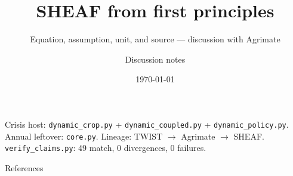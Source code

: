 \documentclass[11pt,aspectratio=169]{beamer}
\title{SHEAF from first principles}
\subtitle{Equation, assumption, unit, and source --- discussion with Agrimate}
\author{Discussion notes}
\date{\today}
\begin{document}
\begin{frame}
\titlepage
\vspace{-1.2em}
\begin{center}
{\scriptsize Crisis host: \texttt{dynamic\_crop.py} + \texttt{dynamic\_coupled.py} + \texttt{dynamic\_policy.py}.\\
Annual leftover: \texttt{core.py}. Lineage: TWIST $\to$ Agrimate $\to$ SHEAF.\\
\texttt{verify\_claims.py}: 49 match, 0 divergences, 0 failures.}
\end{center}
\end{frame}
















\begin{frame}[allowframebreaks]{References}

\end{frame}
\end{document}
